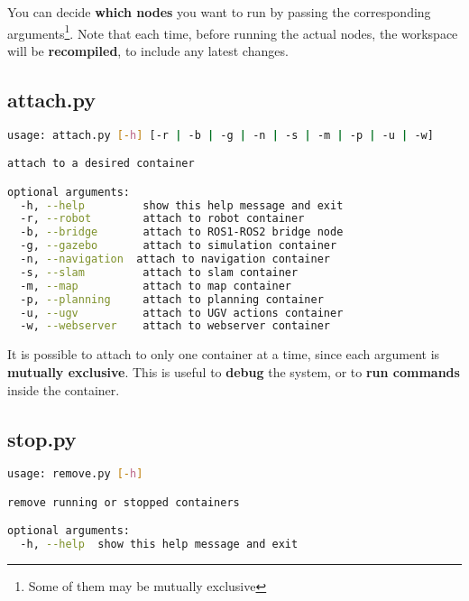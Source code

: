 \noindent You can decide \textbf{which nodes} you want to run by passing the corresponding arguments\footnote{Some of them may be mutually exclusive}. Note that each time, before running the actual nodes, the workspace will be \textbf{recompiled}, to include any latest changes.

\subsection{attach.py}

\begin{lstlisting}[language=bash, style=bashStyle]
usage: attach.py [-h] [-r | -b | -g | -n | -s | -m | -p | -u | -w]

attach to a desired container

optional arguments:
  -h, --help         show this help message and exit
  -r, --robot        attach to robot container
  -b, --bridge       attach to ROS1-ROS2 bridge node
  -g, --gazebo       attach to simulation container
  -n, --navigation  attach to navigation container
  -s, --slam         attach to slam container
  -m, --map          attach to map container
  -p, --planning     attach to planning container
  -u, --ugv          attach to UGV actions container
  -w, --webserver    attach to webserver container  
\end{lstlisting} 

\noindent It is possible to attach to only one container at a time, since each argument is \textbf{mutually exclusive}. This is useful to \textbf{debug} the system, or to \textbf{run commands} inside the container.

\subsection{stop.py}

\begin{lstlisting}[language=bash, style=bashStyle]
usage: remove.py [-h]

remove running or stopped containers

optional arguments:
  -h, --help  show this help message and exit
\end{lstlisting}